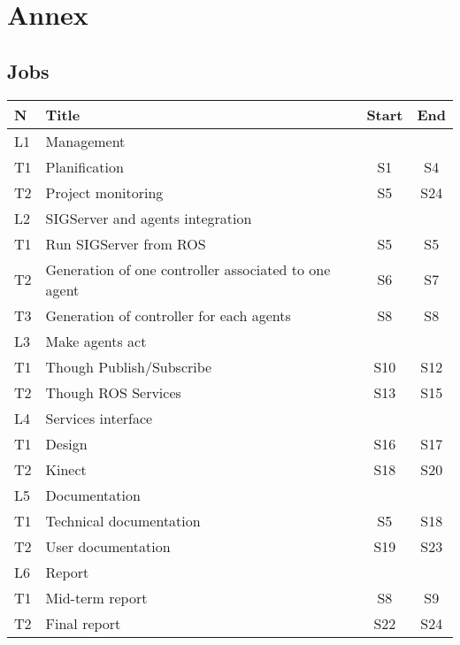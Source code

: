 \chapter{Annex}
\setlength{\parskip}{2.5ex plus .4ex minus .4ex}
\section{Jobs}
\noindent\begin{minipage}{\linewidth}%
\begin{center}
\begin{tabular}{| l | m{8cm} | c | c |}
\hline
	N & Title & Start & End\\\hline
	\rowcolor{cyan} L1 & Management & & \\
	T1	& Planification & S1 & S4\\
	T2	& Project monitoring & S5 & S24\\
	\rowcolor{cyan}L2 & SIGServer and agents integration & &\\
	T1	& Run SIGServer from ROS & S5 & S5\\
	T2	& Generation of one controller associated to one agent & S6 & S7\\
	T3	& Generation of controller for each agents & S8 & S8 \\
	\rowcolor{cyan}L3 & Make agents act & &\\
	T1	& Though Publish/Subscribe & S10 & S12\\
	T2	& Though ROS Services & S13 & S15\\
	\rowcolor{cyan}L4 & Services interface & &\\
	T1	& Design & S16 & S17\\
	T2	& Kinect & S18 & S20\\
	\rowcolor{cyan}L5 & Documentation & &\\
	T1	& Technical documentation & S5 & S18\\
	T2	& User documentation & S19& S23\\
	\rowcolor{cyan}L6 & Report & &\\
	T1	& Mid-term report & S8 & S9\\
	T2	& Final report & S22 & S24\\\hline
\end{tabular}
\end{center}
\label{tab:lots}%
\end{minipage}

